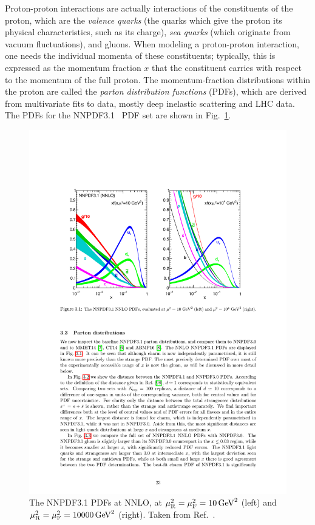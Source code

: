 Proton-proton interactions are actually interactions of the constituents of the proton, which are the \textit{valence quarks} (the quarks which give the proton its physical characteristics, such as its charge), \textit{sea quarks} (which originate from vacuum fluctuations), and gluons.
% 
When modeling a proton-proton interaction, one needs the individual momenta of these constituents; typically, this is expressed as the momentum fraction $x$ that the constituent carries with respect to the momentum of the full proton.
% 
The momentum-fraction distributions within the proton are called the \textit{parton distribution functions} (PDFs), which are derived from multivariate fits to data, mostly deep inelastic scattering and LHC data.
% 
The PDFs for the NNPDF3.1~\cite{Ball:2017nwa} PDF set are shown in Fig.~\ref{fig:nnpdf31}.


\begin{figure}[hbtp]
  \begin{center}
    \includegraphics[width=0.6\linewidth]{img/theory/nnpdf31.pdf}
    \caption{
        The NNPDF3.1 PDFs at NNLO, at $\mu_\mathrm{R}^2=\mu_\mathrm{F}^2=10\,\text{GeV}^2$ (left) and $\mu_\mathrm{R}^2=\mu_\mathrm{F}^2=10000\,\text{GeV}^2$ (right).
        Taken from Ref.~\cite{Ball:2017nwa}.
        }
    \label{fig:nnpdf31}
  \end{center}
\end{figure}



